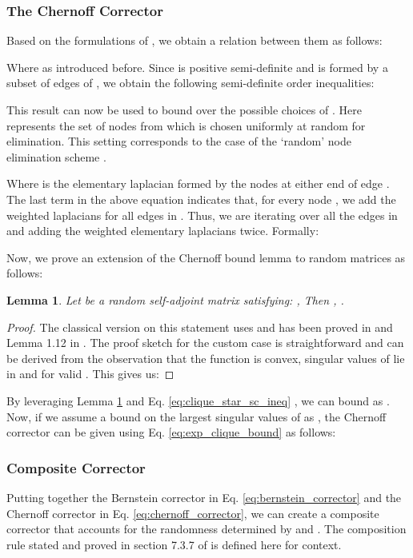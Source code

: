 \documentclass{article}
\theoremstyle{plain}
\newtheorem{lemma}[theorem]{Lemma}
\theoremstyle{definition}
\theoremstyle{remark}
\begin{document}
\subsubsection{The Chernoff Corrector}

Based on the formulations of , we obtain a relation between them as follows:


Where  as introduced before. Since  is positive semi-definite and  is formed by a subset of edges of , we obtain the following semi-definite order inequalities:


This result can now be used to bound  over the possible choices of . Here  represents the set of nodes from which  is chosen uniformly at random for elimination. This setting corresponds to the case of the `random' node elimination scheme .


Where  is the elementary laplacian formed by the nodes at either end of edge . The last term in the above equation indicates that, for every node , we add the weighted laplacians for all edges in . Thus, we are iterating over all the edges in  and adding the weighted elementary laplacians twice. Formally:


Now, we prove an extension of the Chernoff bound lemma to random matrices as follows:

\begin{lemma}
\label{lemma:extended_chernoff}
Let  be a random self-adjoint matrix satisfying: , Then , .
\end{lemma}
\begin{proof}
The classical version on this statement uses  and has been proved in \citet{tropp2012user} and Lemma 1.12 in \citet{tropp2019matrix}. The proof sketch for the custom case is straightforward and can be derived from the observation that the function  is convex, singular values of  lie in  and  for valid . This gives us:

\end{proof}
By leveraging Lemma \ref{lemma:extended_chernoff} and Eq. \ref{eq:clique_star_sc_ineq} , we can bound  as . Now, if we assume a bound on the largest singular values of  as , the Chernoff corrector can be given using Eq. \ref{eq:exp_clique_bound} as follows:




\subsubsection{Composite Corrector}

Putting together the Bernstein corrector in Eq. \ref{eq:bernstein_corrector} and the Chernoff corrector in Eq. \ref{eq:chernoff_corrector}, we can create a composite corrector that accounts for the randomness determined by  and . The composition rule stated and proved in section 7.3.7 of \citet{tropp2019matrix} is defined here for context.
\end{document}
